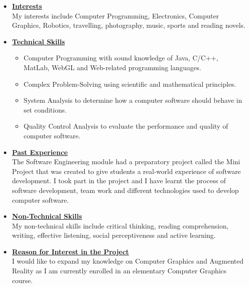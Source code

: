 \documentclass[a4paper,12pt]{article}
\begin{document}
\begin{itemize}
\item {\Large \underline{\textbf{Interests}}}\\[0.2cm]
My interests include Computer Programming, Electronics, Computer Graphics, Robotics, travelling, photography, music, sports and reading novels.
\\
\item {\Large \underline{\textbf{Technical Skills}}}

	\begin{itemize}
		\item Computer Programming with sound knowledge of Java, C/C++, MatLab, WebGL and Web-related 					programming languages.
		\item Complex Problem-Solving using scientific and mathematical principles.
		\item System Analysis to determine how a computer software should behave in set conditions.
		\item Quality Control Analysis to evaluate the performance and quality of computer software.
	\end{itemize}
\bigskip
\item {\Large \underline{\textbf{Past Experience}}}\\[0.2cm]
The Software Engineering module had a preparatory project called the Mini Project that was created to give students a real-world experience of software development. I took part in the project and I have learnt the process of software development, team work and different technologies used to develop computer software. 
\\
\item {\Large \underline{\textbf{Non-Technical Skills}}}\\[0.2cm]
My non-technical skills include critical thinking, reading comprehension, writing, effective listening, social perceptiveness and active learning. 
\\
\item {\Large \underline{\textbf{Reason for Interest in the Project}}}\\[0.2cm]
I would like to expand my knowledge on Computer Graphics and Augmented Reality as I am currently enrolled in an elementary Computer Graphics course.

\end{itemize}

\newpage
\end{document}
